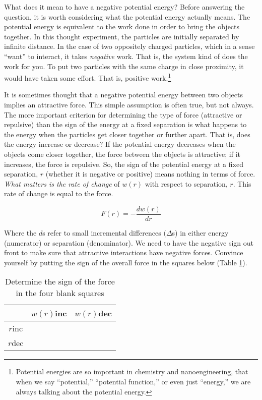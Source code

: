     What does it mean to have a negative potential energy? Before answering the question, it is worth considering what the potential energy actually means. The potential energy is equivalent to the work done in order to bring the objects together. In this thought experiment, the particles are initially separated by infinite distance. In the case of two oppositely charged particles, which in a sense “want” to interact, it takes \textit{negative} work. That is, the system kind of does the work for you. To put two particles with the same charge in close proximity, it would have taken some effort. That is, positive work.\footnote{Potential energies are so important in chemistry and nanoengineering, that when we say ``potential,'' ``potential function,'' or even just ``energy,'' we are always talking about the potential energy.}

    It is sometimes thought that a negative potential energy between two objects implies an attractive force. This simple assumption is often true, but not always. The more important criterion for determining the type of force (attractive or repulsive) than the sign of the energy at a fixed separation is what happens to the energy when the particles get closer together or further apart. That is, does the energy increase or decrease? If the potential energy decreases when the objects come closer together, the force between the objects is attractive; if it increases, the force is repulsive. So, the sign of the potential energy at a fixed separation, $r$ (whether it is negative or positive) means nothing in terms of force. \textit{What matters is the rate of change} of $w(r)$ with respect to separation, $r$. This rate of change is equal to the force.

    \begin{equation}
        \label{force definition}
        F(r) = -\frac{dw(r)}{dr}
    \end{equation}

    Where the $d$s refer to small incremental differences $(\Delta$s) in either energy (numerator) or separation (denominator). We need to have the negative sign out front to make sure that attractive interactions have negative forces. Convince yourself by putting the sign of the overall force in the squares below (Table \ref{Sign of the force}).

    \begin{table}[h]
    \centering
    \begin{tabular}{c|c|c}
        & $w(r)$inc & $w(r)$dec \\  
    \hline
    $r$inc &       &       \\
    \hline
    $r$dec &       &       \\
    \end{tabular}
    \caption{Determine the sign of the force in the four blank squares}
    \label{Sign of the force}
    \end{table}

